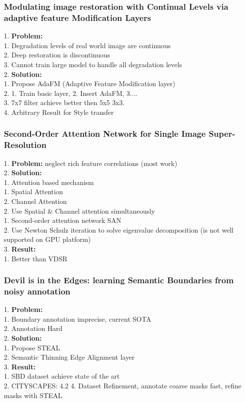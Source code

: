 \subsubsection{Modulating image restoration with Continual Levels via adaptive feature Modification Layers}
    1. {\bf Problem:} \\
        1. Degradation levels of real world image are continuous \\
        2. Deep restoration is discontinuous \\
        3. Cannot train large model to handle all degradation levels \\
    2. {\bf Solution:} \\
        1. Propose AdaFM (Adaptive Feature Modification layer) \\
        2. 1. Train basic layer, 2. Insert AdaFM, 3.... \\
        3. 7x7 filter achieve better then 5x5 3x3. \\
        4. Arbitrary Result for Style transfer \\
\subsubsection{Second-Order Attention Network for Single Image Super-Resolution}
    1. {\bf Problem:} neglect rich feature correlations (most work) \\
    2. {\bf Solution:} \\
        1. Attention based mechanism \\
            1. Spatial Attention \\
            2. Channel Attention \\
        2. Use Spatial \& Channel attention simultaneously \\
            1. Second-order attention network SAN \\
            2. Use Newton Schulz iteration to solve eigenvalue decomposition (is not well supported on GPU platform) \\
    3. {\bf Result:} \\
        1. Better than VDSR \\
\subsubsection{Devil is in the Edges: learning Semantic Boundaries from noisy annotation}
    1. {\bf Problem:} \\
        1. Boundary annotation imprecise, current SOTA \\
        2. Annotation Hard \\
    2. {\bf Solution:} \\
        1. Propose STEAL \\
        2. Semantic Thinning Edge Alignment layer \\
    3. {\bf Result:} \\
        1. SBD dataset achieve state of the art \\
        2. CITYSCAPES: 4.2%
    4. Dataset Refinement, annotate coarse masks fast, refine masks with STEAL \\
